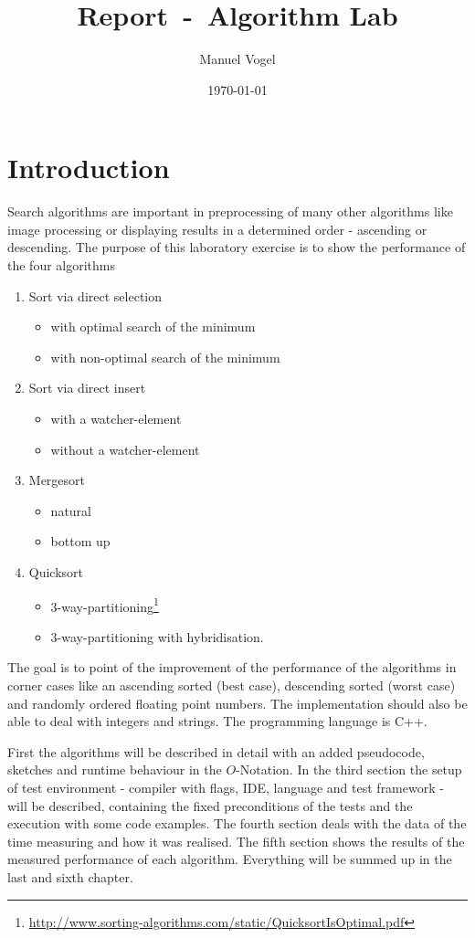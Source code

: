 \documentclass[11pt]{amsart}
\title{Report~-~Algorithm Lab}
\author{Manuel Vogel}
\date{\today} %
\begin{document}
\maketitle
\section{Introduction}
Search algorithms are important in preprocessing of many other algorithms like image processing or displaying results in a determined order - ascending or descending.
The purpose of this laboratory exercise is to show the performance of the four algorithms 
\begin{enumerate}
	\item Sort via direct selection
		\begin{itemize}
			\item with optimal search of the minimum
			\item with non-optimal search of the minimum
		\end{itemize}
	\item Sort via direct insert
		\begin{itemize}
			\item with a watcher-element
			\item without a watcher-element
		\end{itemize}
	\item Mergesort
		\begin{itemize}
			\item natural
			\item bottom up
		\end{itemize}
	\item Quicksort
		\begin{itemize}
			\item 3-way-partitioning\footnote{\url{http://www.sorting-algorithms.com/static/QuicksortIsOptimal.pdf}}
			\item 3-way-partitioning with hybridisation.
		\end{itemize}
\end{enumerate}
The goal is to point of the improvement of the performance of the algorithms in corner cases like an ascending sorted (best case), descending sorted (worst case) and randomly ordered floating point numbers. The implementation should also be able to deal with integers and strings. The programming language is C++.

First the algorithms will be described in detail with an added pseudocode, sketches and runtime behaviour in the $O$-Notation. In the third section the setup of test environment - compiler with flags, IDE, language and test framework - will be described, containing the fixed preconditions of the tests and the execution with some code examples. The fourth section deals with the data of the time measuring and how it was realised. The fifth section shows the results of the measured performance of each algorithm. Everything will be summed up in the last and sixth chapter. 
\end{document}
